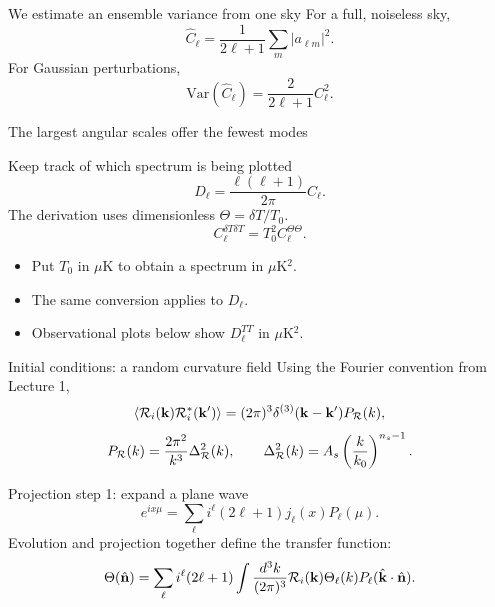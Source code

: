 \begin{frame}{We estimate an ensemble variance from one sky}
For a full, noiseless sky,
\[\widehat C_\ell=\frac1{2\ell+1}\sum_m|a_{\ell m}|^2.\]
For Gaussian perturbations,
\[\boxed{\mathrm{Var}(\widehat C_\ell)=\frac{2}{2\ell+1}C_\ell^2.}\]
\end{frame}

\begin{frame}{The largest angular scales offer the fewest modes}
\end{frame}

\begin{frame}{Keep track of which spectrum is being plotted}
\[D_\ell=\frac{\ell(\ell+1)}{2\pi}C_\ell.\]
The derivation uses dimensionless $\Theta=\delta T/T_0$.
\[C_\ell^{\delta T\delta T}=T_0^2 C_\ell^{\Theta\Theta}.\]
\begin{itemize}
\item Put $T_0$ in $\mu$K to obtain a spectrum in $\mu$K$^2$.
\item The same conversion applies to $D_\ell$.
\item Observational plots below show $D_\ell^{TT}$ in $\mu$K$^2$.
\end{itemize}
\end{frame}

\begin{frame}{Initial conditions: a random curvature field}
Using the Fourier convention from Lecture 1,
\[\langle\mathcal R_i(\mathbf k)\mathcal R_i^*(\mathbf k')\rangle
=(2\pi)^3\delta^{(3)}(\mathbf k-\mathbf k')P_{\mathcal R}(k),\]
\[P_{\mathcal R}(k)=\frac{2\pi^2}{k^3}\Delta_{\mathcal R}^2(k),\qquad
\Delta_{\mathcal R}^2(k)=A_s\left(\frac{k}{k_0}\right)^{n_s-1}.\]
\end{frame}

\begin{frame}{Projection step 1: expand a plane wave}
\[e^{ix\mu}=\sum_\ell i^\ell(2\ell+1)j_\ell(x)P_\ell(\mu).\]
Evolution and projection together define the transfer function:
\small
\[\Theta(\hat{\mathbf n})=\sum_\ell i^\ell(2\ell+1)
\int\frac{d^3k}{(2\pi)^3}\mathcal R_i(\mathbf k)\Theta_\ell(k)
P_\ell(\hat{\mathbf k}\cdot\hat{\mathbf n}).\]
\normalsize
{}
\end{frame}

